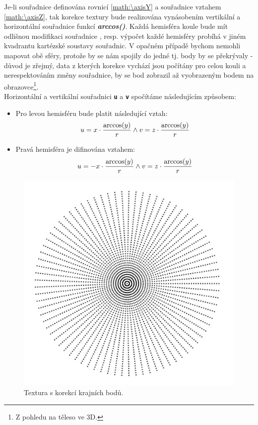 Je-li  souřadnice \textit{\textbf{\axisY}} definována rovnicí \ref{math:\axisY} a souřadnice \textit{\textbf{\axisZ}} vztahem \ref{math:\axisZ}, tak korekce textury bude realizována vynásobením  vertikální a horizontální souřadnice funkcí \textit{\textbf{arccos(\axisY)}}. Každá hemisféra koule bude mít odlišnou modifikaci souřadnice \texttt{\textbf{\axisX{}}}, resp. výpočet každé hemisféry probíhá v jiném kvadrantu kartézské soustavy souřadnic. V opačném případě bychom nemohli mapovat obě sféry, protože by se nám spojily do jedné tj. body by se překrývaly - důvod je zřejmý, data z kterých korekce vychází jsou počítány pro celou kouli a nerespektováním změny souřadnice, by se bod zobrazil až   vyobrazeným bodem na obrazovce\footnote{Z pohledu na těleso ve 3D.}. \\

Horizontální a vertikální souřadnici \texttt{\textbf{u}} a \texttt{\textbf{v}} spočítáme následujícím způsobem:




\begin{itemize}
	\item Pro levou hemisféru bude platit následující vztah:\\
		    $$u =  x{} \cdot \frac{\arccos(y{})}{r} \wedge v =  z{} \cdot \frac{\arccos(y{})}{r}$$   
		   
	\item Pravá hemisféra je difinována vztahem:\\
			$$u =  -x{} \cdot \frac{\arccos(y{})}{r}\wedge v =  z{} \cdot \frac{\arccos(y{})}{r} $$ 
 
\end{itemize}
 

\begin{figure}[h]
	\label{img:texture_with_correction}
	\centering
	\includegraphics[scale=1.0,angle=0,width=0.6\linewidth]{obrazky-figures/texture_correction}
	\caption{Textura s korekcí krajních bodů.}
\end{figure}

